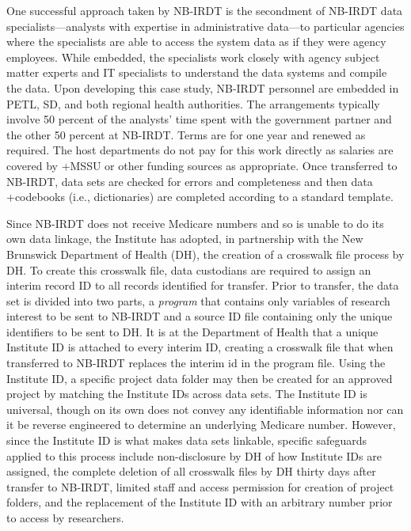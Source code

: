 \documentclass[
]{WileySix}
\begin{document}
One successful approach taken by NB-IRDT is the secondment of NB-IRDT data specialists---analysts with expertise in administrative data---to particular agencies where the specialists are able to access the system data as if they were agency employees. While embedded, the specialists work closely with agency subject matter experts and IT specialists to understand the data systems and compile the data. Upon developing this case study, NB-IRDT personnel are embedded in PETL, SD, and both regional health authorities. The arrangements typically involve 50 percent of the analysts' time spent with the government partner and the other 50 percent at NB-IRDT. Terms are for one year and renewed as required. The host departments do not pay for this work directly as salaries are covered by +MSSU\textbar{} or other funding sources as appropriate. Once transferred to NB-IRDT, data sets are checked for errors and completeness and then data +codebooks\textbar{} (i.e., dictionaries) are completed according to a standard template.

Since NB-IRDT does not receive Medicare numbers and so is unable to do its own data linkage, the Institute has adopted, in partnership with the New Brunswick Department of Health (DH), the creation of a crosswalk file process by DH. To create this crosswalk file, data custodians are required to assign an interim record ID to all records identified for transfer. Prior to transfer, the data set is divided into two parts, a \emph{program} that contains only variables of research interest to be sent to NB-IRDT and a source ID file containing only the unique identifiers to be sent to DH. It is at the Department of Health that a unique Institute ID is attached to every interim ID, creating a crosswalk file that when transferred to NB-IRDT replaces the interim id in the program file. Using the Institute ID, a specific project data folder may then be created for an approved project by matching the Institute IDs across data sets. The Institute ID is universal, though on its own does not convey any identifiable information nor can it be reverse engineered to determine an underlying Medicare number. However, since the Institute ID is what makes data sets linkable, specific safeguards applied to this process include non-disclosure by DH of how Institute IDs are assigned, the complete deletion of all crosswalk files by DH thirty days after transfer to NB-IRDT, limited staff and access permission for creation of project folders, and the replacement of the Institute ID with an arbitrary number prior to access by researchers.
\end{document}
